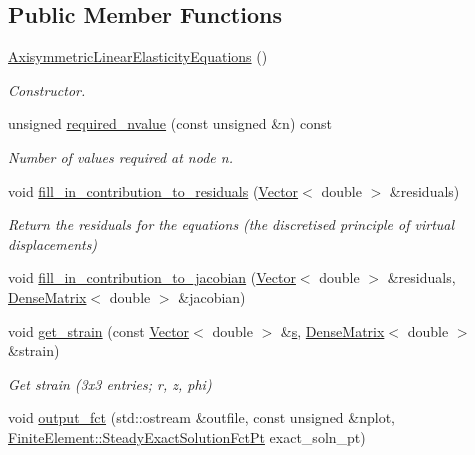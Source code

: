 \subsection*{Public Member Functions}
\begin{DoxyCompactItemize}
\item 
\hyperlink{classoomph_1_1AxisymmetricLinearElasticityEquations_a858da85e306cdaea7215e05fac652632}{Axisymmetric\+Linear\+Elasticity\+Equations} ()
\begin{DoxyCompactList}\small\item\em Constructor. \end{DoxyCompactList}\item 
unsigned \hyperlink{classoomph_1_1AxisymmetricLinearElasticityEquations_a9545ca241d42981a9d3561857af7cbb9}{required\+\_\+nvalue} (const unsigned \&n) const
\begin{DoxyCompactList}\small\item\em Number of values required at node n. \end{DoxyCompactList}\item 
void \hyperlink{classoomph_1_1AxisymmetricLinearElasticityEquations_adadd2893e700f16f0866b558a687aadb}{fill\+\_\+in\+\_\+contribution\+\_\+to\+\_\+residuals} (\hyperlink{classoomph_1_1Vector}{Vector}$<$ double $>$ \&residuals)
\begin{DoxyCompactList}\small\item\em Return the residuals for the equations (the discretised principle of virtual displacements) \end{DoxyCompactList}\item 
void \hyperlink{classoomph_1_1AxisymmetricLinearElasticityEquations_ab773f8081f53cd71666eca2d0031ecec}{fill\+\_\+in\+\_\+contribution\+\_\+to\+\_\+jacobian} (\hyperlink{classoomph_1_1Vector}{Vector}$<$ double $>$ \&residuals, \hyperlink{classoomph_1_1DenseMatrix}{Dense\+Matrix}$<$ double $>$ \&jacobian)
\item 
void \hyperlink{classoomph_1_1AxisymmetricLinearElasticityEquations_a079d1722a01188f2e06911932af3da1f}{get\+\_\+strain} (const \hyperlink{classoomph_1_1Vector}{Vector}$<$ double $>$ \&\hyperlink{cfortran_8h_ab7123126e4885ef647dd9c6e3807a21c}{s}, \hyperlink{classoomph_1_1DenseMatrix}{Dense\+Matrix}$<$ double $>$ \&strain)
\begin{DoxyCompactList}\small\item\em Get strain (3x3 entries; r, z, phi) \end{DoxyCompactList}\item 
void \hyperlink{classoomph_1_1AxisymmetricLinearElasticityEquations_ae1b89f9d9c661385fe2bfcf0cbf4df20}{output\+\_\+fct} (std\+::ostream \&outfile, const unsigned \&nplot, \hyperlink{classoomph_1_1FiniteElement_a690fd33af26cc3e84f39bba6d5a85202}{Finite\+Element\+::\+Steady\+Exact\+Solution\+Fct\+Pt} exact\+\_\+soln\+\_\+pt)

\end{DoxyCompactItemize}
